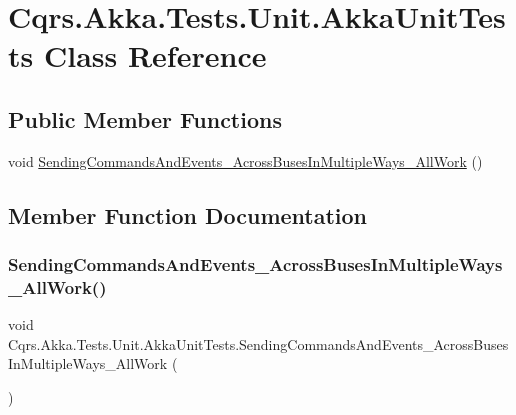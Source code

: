 \hypertarget{classCqrs_1_1Akka_1_1Tests_1_1Unit_1_1AkkaUnitTests}{}\section{Cqrs.\+Akka.\+Tests.\+Unit.\+Akka\+Unit\+Tests Class Reference}
\label{classCqrs_1_1Akka_1_1Tests_1_1Unit_1_1AkkaUnitTests}
\subsection*{Public Member Functions}
\begin{DoxyCompactItemize}
\item 
void \hyperlink{classCqrs_1_1Akka_1_1Tests_1_1Unit_1_1AkkaUnitTests_a52e29eb0469798255ae67613e2f4645b_a52e29eb0469798255ae67613e2f4645b}{Sending\+Commands\+And\+Events\+\_\+\+Across\+Buses\+In\+Multiple\+Ways\+\_\+\+All\+Work} ()
\end{DoxyCompactItemize}


\subsection{Member Function Documentation}
\mbox{\label{classCqrs_1_1Akka_1_1Tests_1_1Unit_1_1AkkaUnitTests_a52e29eb0469798255ae67613e2f4645b_a52e29eb0469798255ae67613e2f4645b}} 
\subsubsection{\texorpdfstring{Sending\+Commands\+And\+Events\+\_\+\+Across\+Buses\+In\+Multiple\+Ways\+\_\+\+All\+Work()}{SendingCommandsAndEvents\_AcrossBusesInMultipleWays\_AllWork()}}
{\footnotesize\ttfamily void Cqrs.\+Akka.\+Tests.\+Unit.\+Akka\+Unit\+Tests.\+Sending\+Commands\+And\+Events\+\_\+\+Across\+Buses\+In\+Multiple\+Ways\+\_\+\+All\+Work (\begin{DoxyParamCaption}{ }\end{DoxyParamCaption})}

